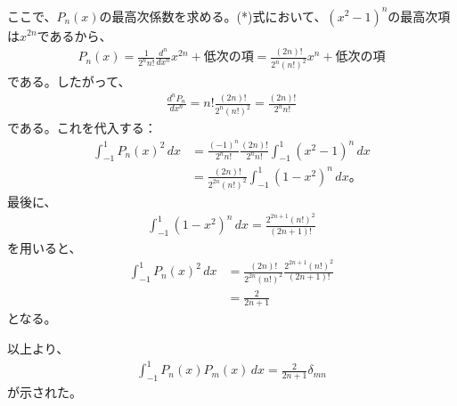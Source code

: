 \documentclass[platex,dvipdfmx,a4paper]{jsarticle}
\begin{document}
  ここで、$P_n(x)$の最高次係数を求める。(*)式において、$(x^2-1)^n$の最高次項は$x^{2n}$であるから、
  \begin{align*}
    P_n(x)
    =
    \frac{1}{2^n n!}\frac{d^n}{dx^n}x^{2n}+\text{低次の項}
    =
    \frac{(2n)!}{2^n(n!)^2}x^n+\text{低次の項}
  \end{align*}
  である。したがって、
  \begin{align*}
    \frac{d^nP_n}{dx^n}
    =
    n!\frac{(2n)!}{2^n(n!)^2}
    =
    \frac{(2n)!}{2^n n!}
  \end{align*}
  である。これを代入する：
  \begin{align*}
    \int_{-1}^{1}P_n(x)^2\,dx
    &=
    \frac{(-1)^n}{2^n n!}
    \frac{(2n)!}{2^n n!}
    \int_{-1}^{1}(x^2-1)^n\,dx\\
    &=
    \frac{(2n)!}{2^{2n}(n!)^2}
    \int_{-1}^{1}(1-x^2)^n\,dx。
  \end{align*}
  最後に、
  \begin{align*}
    \int_{-1}^{1}(1-x^2)^n\,dx
    =
    \frac{2^{2n+1}(n!)^2}{(2n+1)!}
  \end{align*}
  を用いると、
  \begin{align*}
    \int_{-1}^{1}P_n(x)^2\,dx
    &=
    \frac{(2n)!}{2^{2n}(n!)^2}
    \frac{2^{2n+1}(n!)^2}{(2n+1)!}\\
    &=
    \frac{2}{2n+1}
  \end{align*}
  となる。
  
  以上より、
  \begin{align*}
    \int_{-1}^{1}P_n(x)P_m(x)\,dx
    =
    \frac{2}{2n+1}\delta_{mn}
  \end{align*}
  が示された。
  
\end{document}
